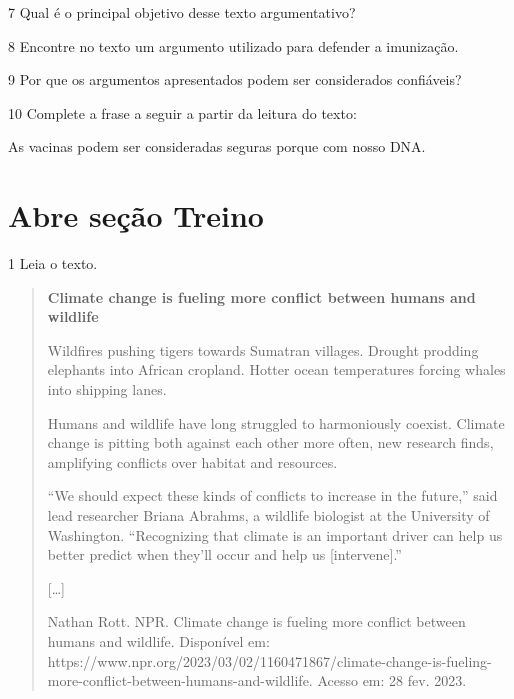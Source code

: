 \num{7} Qual é o principal objetivo desse texto argumentativo?

\linhas[2]


\num{8} Encontre no texto um argumento utilizado para defender a
imunização.

\linhas[2]


\num{9} Por que os argumentos apresentados podem ser considerados
confiáveis?

\linhas[2]


\num{10} Complete a frase a seguir a partir da leitura do texto:

As vacinas podem ser consideradas seguras porque \preencher com nosso DNA.


\section{Abre seção Treino}

\num{1} Leia o texto.

\begin{quote}
\textbf{Climate change is fueling more conflict between humans and wildlife}

Wildfires pushing tigers towards Sumatran villages. Drought prodding
elephants into African cropland. Hotter ocean temperatures forcing
whales into shipping lanes.

Humans and wildlife have long struggled to harmoniously coexist. Climate
change is pitting both against each other more often, new research
finds, amplifying conflicts over habitat and resources.

``We should expect these kinds of conflicts to increase in the future,''
said lead researcher Briana Abrahms, a wildlife biologist at the
University of Washington. ``Recognizing that climate is an important
driver can help us better predict when they'll occur and help us
{[}intervene{]}.''

{[}\ldots{}{]}

Nathan Rott. NPR. Climate change is fueling more conflict between humans
and wildlife. Disponível em:
https://www.npr.org/2023/03/02/1160471867/climate-change-is-fueling-more-conflict-between-humans-and-wildlife.
Acesso em: 28 fev. 2023.
\end{quote}


